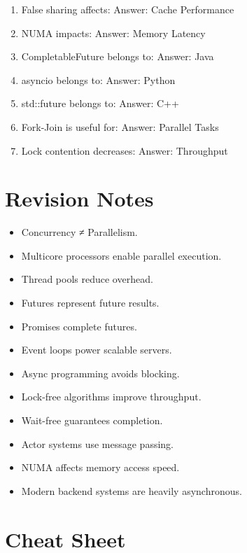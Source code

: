 \begin{enumerate}
\item False sharing affects:
Answer: Cache Performance

\item NUMA impacts:
Answer: Memory Latency

\item CompletableFuture belongs to:
Answer: Java

\item asyncio belongs to:
Answer: Python

\item std::future belongs to:
Answer: C++

\item Fork-Join is useful for:
Answer: Parallel Tasks

\item Lock contention decreases:
Answer: Throughput
\end{enumerate}

\section{Revision Notes}

\begin{itemize}
\item Concurrency ≠ Parallelism.
\item Multicore processors enable parallel execution.
\item Thread pools reduce overhead.
\item Futures represent future results.
\item Promises complete futures.
\item Event loops power scalable servers.
\item Async programming avoids blocking.
\item Lock-free algorithms improve throughput.
\item Wait-free guarantees completion.
\item Actor systems use message passing.
\item NUMA affects memory access speed.
\item Modern backend systems are heavily asynchronous.
\end{itemize}

\section{Cheat Sheet}


